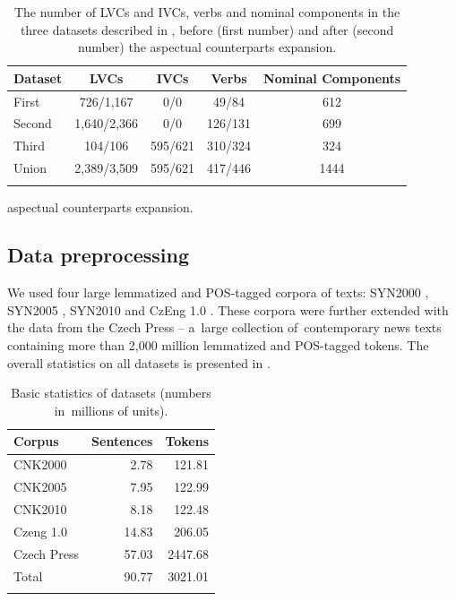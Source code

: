 \documentclass[output=paper
,modfonts
,nonflat]{langsci/langscibook}
\begin{document}
\begin{table}[tb]
	\centering
	\begin{tabular}{lcccc}
	 \lsptoprule
     Dataset  & LVCs        & IVCs    & Verbs   & Nominal Components \\ \midrule
     First    & 726/1,167   & 0/0     & 49/84   & 612   \\ %
     Second   & 1,640/2,366 & 0/0     & 126/131 & 699   \\ %
     Third    & 104/106     & 595/621 & 310/324 & 324   \\ %
     Union\footnotemark    & 2,389/3,509 & 595/621 & 417/446 & 1444  \\ 
	\lspbottomrule  
	\end{tabular} 
	\caption{The number of LVCs and IVCs, verbs and nominal components in the 
	three datasets described in , before (first number) and after (second number) the aspectual counterparts expansion.}%
	\label{statistics}
\end{table}

	aspectual counterparts expansion. 

	
\subsection{Data preprocessing} 
\label{sec:preprocess}
We used four large lemmatized and POS-tagged corpora of  texts: 
SYN2000 \citep{SYN2000}, SYN2005 \citep{SYN2005}, SYN2010 \citep{SYN2010} and 
CzEng 1.0 \citep{czeng10}. These corpora were further extended with the 
data from the Czech Press -- a~large collection of~contemporary news texts 
containing more than 2,000 million lemmatized and POS-tagged tokens. The 
overall statistics on all datasets is presented in .

\begin{table}[tb]
\centering
\begin{tabular}{lrr}
\lsptoprule
Corpus & Sentences & Tokens \\ 
\midrule
CNK2000 & 2.78 & 121.81 \\
CNK2005 & 7.95 & 122.99 \\
CNK2010 & 8.18 & 122.48 \\
Czeng 1.0 & 14.83 & 206.05 \\
Czech Press & 57.03 & 2447.68 \\ \midrule
Total & 90.77 & 3021.01 \\
\lspbottomrule
\end{tabular}
\caption{Basic statistics of datasets (numbers in~millions of units).}
\label{data}
\end{table}
\end{document}
